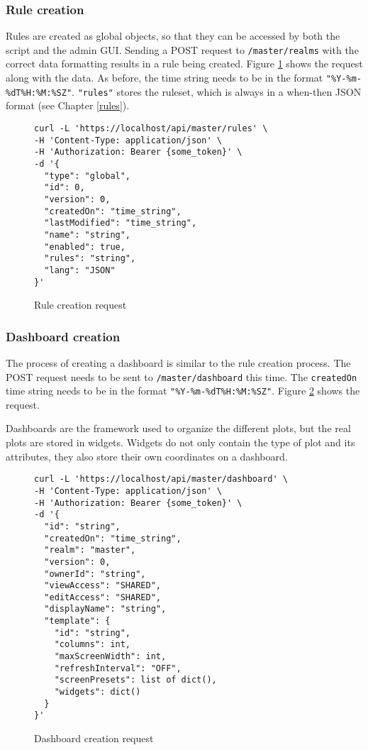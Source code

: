 \subsubsection{Rule creation}
Rules are created as global objects, so that they can be accessed by both the script and the admin GUI. Sending a POST request to \lstinline|/master/realms| with the correct data formatting results in a rule being created. Figure \ref{fig:rule-create-request} shows the request along with the data. As before, the time string needs to be in the format \lstinline{"%Y-%m-%dT%H:%M:%SZ"}. \lstinline{"rules"} stores the ruleset, which is always in a when-then JSON format (see Chapter \ref{rules}).
\begin{figure}[ht]
    \centering
    \begin{lstlisting}[language=curl,firstnumber=1]
curl -L 'https://localhost/api/master/rules' \
-H 'Content-Type: application/json' \
-H 'Authorization: Bearer {some_token}' \
-d '{
  "type": "global",
  "id": 0,
  "version": 0,
  "createdOn": "time_string",
  "lastModified": "time_string",
  "name": "string",
  "enabled": true,
  "rules": "string",
  "lang": "JSON"
}'
\end{lstlisting}
    \caption{Rule creation request}
    \label{fig:rule-create-request}
\end{figure}

\subsubsection{Dashboard creation}
The process of creating a dashboard is similar to the rule creation process. The POST request needs to be sent to \lstinline|/master/dashboard| this time. The \lstinline|createdOn| time string needs to be in the format \lstinline{"%Y-%m-%dT%H:%M:%SZ"}. Figure \ref{fig:dashboard-create-request} shows the request.

Dashboards are the framework used to organize the different plots, but the real plots are stored in widgets. Widgets do not only contain the type of plot and its attributes, they also store their own coordinates on a dashboard. 

\begin{figure}[ht]
    \centering
    \begin{lstlisting}[language=curl,firstnumber=1]
curl -L 'https://localhost/api/master/dashboard' \
-H 'Content-Type: application/json' \
-H 'Authorization: Bearer {some_token}' \
-d '{
  "id": "string",
  "createdOn": "time_string",
  "realm": "master",
  "version": 0,
  "ownerId": "string",
  "viewAccess": "SHARED",
  "editAccess": "SHARED",
  "displayName": "string",
  "template": {
    "id": "string",
    "columns": int,
    "maxScreenWidth": int,
    "refreshInterval": "OFF",
    "screenPresets": list of dict(),
    "widgets": dict()
  }
}'
\end{lstlisting}
    \caption{Dashboard creation request}
    \label{fig:dashboard-create-request}
\end{figure}


